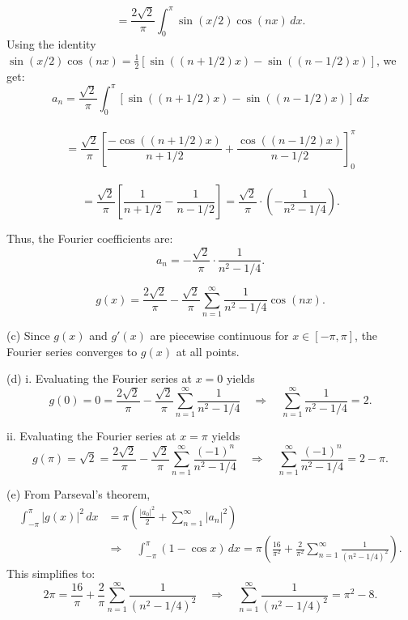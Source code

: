 \documentclass[10pt,landscape]{article}
\begin{document}
\begin{multicols}{2}
\[
= \frac{2\sqrt{2}}{\pi} \int_0^\pi \sin(x/2) \cos(nx) \, dx.
\]
Using the identity \( \sin(x/2) \cos(nx) = \frac{1}{2} \left[ \sin((n+1/2)x) - \sin((n-1/2)x) \right] \), we get:\\
\[
a_n = \frac{\sqrt{2}}{\pi} \int_0^\pi \left[ \sin((n + 1/2)x) - \sin((n - 1/2)x) \right] \, dx
\]
\\
\[
= \frac{\sqrt{2}}{\pi} \left[ \frac{-\cos((n + 1/2)x)}{n + 1/2} + \frac{\cos((n - 1/2)x)}{n - 1/2} \right]_{0}^{\pi}
\]\\
\[
= \frac{\sqrt{2}}{\pi} \left[ \frac{1}{n + 1/2} - \frac{1}{n - 1/2} \right]
= \frac{\sqrt{2}}{\pi} \cdot \left( -\frac{1}{n^2 - 1/4} \right).
\]

Thus, the Fourier coefficients are:\\
\[
a_n = -\frac{\sqrt{2}}{\pi} \cdot \frac{1}{n^2 - 1/4}.
\]

$$
g(x) = \frac{2\sqrt{2}}{\pi} - \frac{\sqrt{2}}{\pi} \sum_{n=1}^{\infty} \frac{1}{n^2 - 1/4} \cos(nx). 
$$

(c) Since \(g(x)\) and \(g'(x)\) are piecewise continuous for \(x \in [-\pi, \pi]\), the Fourier series converges to \(g(x)\) at all points.

(d) i. Evaluating the Fourier series at \(x = 0\) yields\\
\[
g(0) = 0 = \frac{2\sqrt{2}}{\pi} - \frac{\sqrt{2}}{\pi} \sum_{n=1}^{\infty} \frac{1}{n^2 - 1/4} 
\quad \Rightarrow \quad \sum_{n=1}^{\infty} \frac{1}{n^2 - 1/4} = 2.
\]

ii. Evaluating the Fourier series at \(x = \pi\) yields\\
\[
g(\pi) = \sqrt{2} = \frac{2\sqrt{2}}{\pi} - \frac{\sqrt{2}}{\pi} \sum_{n=1}^{\infty} \frac{(-1)^n}{n^2 - 1/4} 
\quad \Rightarrow \quad \sum_{n=1}^{\infty} \frac{(-1)^n}{n^2 - 1/4} = 2 - \pi.
\]

(e) From Parseval’s theorem,\small\\
\begin{align*}
\int_{-\pi}^{\pi} |g(x)|^2 \, dx &= \pi \left( \frac{|a_0|^2}{2} + \sum_{n=1}^{\infty} |a_n|^2 \right) \\
&\Rightarrow \quad \int_{-\pi}^{\pi} (1 - \cos x) \, dx = \pi \left( \frac{16}{\pi^2} + \frac{2}{\pi^2} \sum_{n=1}^{\infty} \frac{1}{(n^2 - 1/4)^2} \right).
\end{align*}
This simplifies to:\normalsize\\
\[
2\pi = \frac{16}{\pi} + \frac{2}{\pi} \sum_{n=1}^{\infty} \frac{1}{(n^2 - 1/4)^2}
\quad \Rightarrow \quad \sum_{n=1}^{\infty} \frac{1}{(n^2 - 1/4)^2} = \pi^2 - 8.
\]


\end{multicols}
\end{document}
